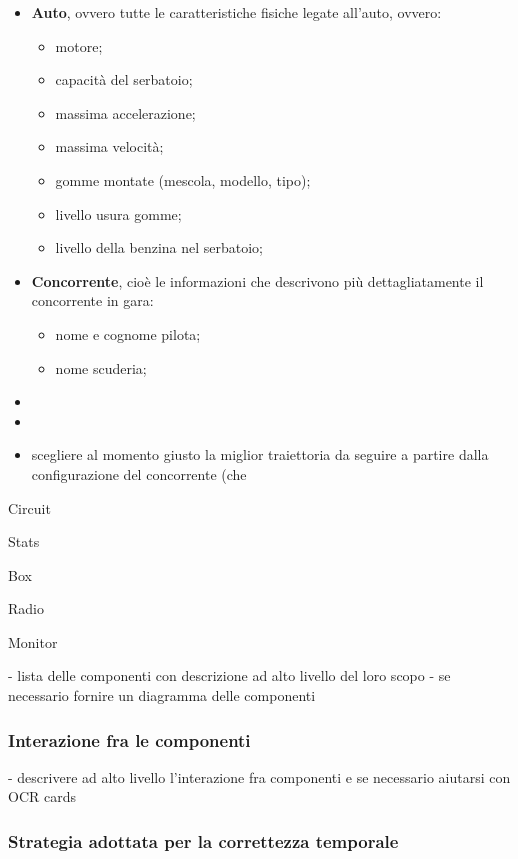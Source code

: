 \begin{description}
\begin{itemize}
\item \textbf{Auto}, ovvero tutte le caratteristiche fisiche legate all'auto, ovvero:
	\begin{itemize}
		\item motore;
		\item capacità del serbatoio;
		\item massima accelerazione;
		\item massima velocità;
		\item gomme montate (mescola, modello, tipo);
		\item livello usura gomme;
		\item livello della benzina nel serbatoio;
	\end{itemize}
\item \textbf{Concorrente}, cioè le informazioni che descrivono più dettagliatamente il concorrente in gara:
	\begin{itemize}
		\item nome e cognome pilota;
		\item nome scuderia;
	\end{itemize}
\item
\item
\end{itemize}
	\begin{itemize}
		\item scegliere al momento giusto la miglior traiettoria da seguire a partire dalla configurazione
			del concorrente (che
	\end{itemize}
\item{Circuit}
\item{Stats}
\item{Box}
\item{Radio}
\item{Monitor}
\end{description}
 - lista delle componenti con descrizione ad alto livello del loro scopo
 - se necessario fornire un diagramma delle componenti
\subsubsection{Interazione fra le componenti}
 - descrivere ad alto livello l'interazione fra componenti e se necessario aiutarsi con OCR cards
\subsubsection{Strategia adottata per la correttezza temporale}
